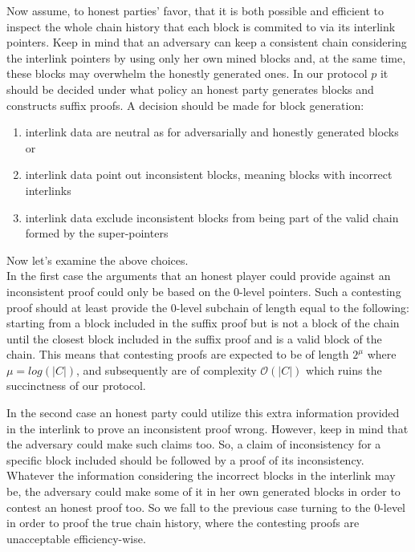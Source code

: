 Now assume, to honest parties' favor, that it is both possible and efficient to inspect the whole chain history that each block is commited to via its interlink pointers. Keep in mind that an adversary can keep a consistent chain considering the interlink pointers by using only her own mined blocks and, at the same time, these blocks may overwhelm the honestly generated ones. In our protocol $p$ it should be decided  under what policy an honest party generates blocks and constructs suffix proofs. A decision should be made for block generation:
\begin{enumerate}
\item interlink data are neutral as for adversarially and honestly generated blocks or 
\item interlink data point out inconsistent blocks, meaning blocks with incorrect interlinks
\item interlink data exclude inconsistent blocks from being part of the valid chain formed by the super-pointers
\end{enumerate}
Now let's examine the above choices. \\
In the first case the arguments that an honest player could provide against an inconsistent proof could only be based on the 0-level pointers. Such a contesting proof should at least provide the 0-level subchain of length equal to the following: starting from a block included in the suffix proof but is not a block of the chain until the closest block included in the suffix proof and is a valid block of the chain. This means that contesting proofs are expected to be of length $2^\mu$ where $\mu = log(|C|)$, and subsequently are of complexity $\mathcal{O}(|C|)$ which ruins the succinctness of our protocol.

In the second case an honest party could utilize this extra information provided in the interlink to prove an inconsistent proof wrong. However, keep in mind that the adversary could make such claims too. So, a claim of inconsistency for a specific block included should be followed by a proof of its inconsistency. Whatever the information considering the incorrect blocks in the interlink may be, the adversary could make some of it in her own generated blocks in order to contest an honest proof too. So we fall to the previous case turning to the 0-level in order to proof the true chain history, where the contesting proofs are unacceptable efficiency-wise.

